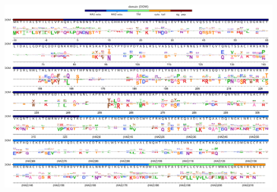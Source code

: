 \documentclass[9pt,twocolumn,twoside]{pnas-new}
\begin{document}
\begin{suppfigure}[H]
\centerline{\includegraphics[width=0.9\textwidth]{figs/supp_diffprefs/diffprefs.pdf}}
\caption{\label{suppfig:diffprefs_logoplot}
{\bf Sites where there are strong differences between our experimental measurements and the amino-acid frequencies among natural HA sequences.}
We calculated the distance between our H3 measurements and the alignment frequencies using the same approach as in Figure~\ref{fig:distance_distribution}, but using the alignment frequencies in place of the H1 preferences.
For each site, the height of each letter above or below the line indicate how much more or less preferred that amino acid is in our experiments compared to its frequency nature.
The overlays show the same information as in Figure~\ref{fig:logoplot} (domain and wildtype amino acid).
The sites are in H3 numbering.
The HA alignment used to calculate the natural frequencies is the same one used in Table~\ref{tab:phydms}.
}
\end{suppfigure}
\end{document}

